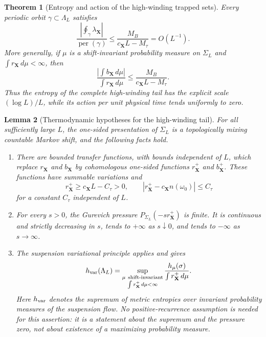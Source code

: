 \documentclass[11pt]{amsart}
\numberwithin{equation}{section}
\newtheorem{theorem}{Theorem}[section]
\newtheorem{lemma}[theorem]{Lemma}
\theoremstyle{definition}
\theoremstyle{remark}
\begin{document}
\begin{theorem}[Entropy and action of the high-winding trapped sets]
Every periodic orbit $\gamma\subset\Lambda_L$ satisfies
\begin{equation}\label{eq:tail-periodic-action-rate}
 \frac{\left|\displaystyle\oint_\gamma\lambda_{\mathbf X}\right|}
      {\operatorname{per}(\gamma)}
 \le \frac{M_B}{c_{\mathbf X}L-M_\tau}=O(L^{-1}).
\end{equation}
More generally, if $\mu$ is a shift-invariant probability measure on
$\Sigma_L$ and $\int r_{\mathbf X}\,d\mu<\infty$, then
\begin{equation}\label{eq:tail-measure-action-rate}
 \frac{\left|\int b_{\mathbf X}\,d\mu\right|}
      {\int r_{\mathbf X}\,d\mu}
 \le \frac{M_B}{c_{\mathbf X}L-M_\tau}.
\end{equation}
Thus the entropy of the complete high-winding tail has the explicit scale
$(\log L)/L$, while its action per unit physical time tends uniformly to
zero.
\end{theorem}

\begin{lemma}[Thermodynamic hypotheses for the high-winding tail]
\label{lem:tail-thermodynamic-hypotheses}
For all sufficiently large $L$, the one-sided presentation of
$\Sigma_L$ is a topologically mixing countable Markov shift, and the
following facts hold.
\begin{enumerate}
\renewcommand{\labelenumi}{\textup{(\roman{enumi})}}
\item There are bounded transfer functions, with bounds independent of
$L$, which replace $r_{\mathbf X}$ and $b_{\mathbf X}$ by cohomologous
one-sided functions $r_{\mathbf X}^+$ and $b_{\mathbf X}^+$.  These
functions have summable variations and
\begin{equation}\label{eq:tail-one-sided-roof-bounds}
 r_{\mathbf X}^+\ge c_{\mathbf X}L-C_\tau>0,
 \qquad
 |r_{\mathbf X}^+-c_{\mathbf X}n(\omega_0)|\le C_\tau
\end{equation}
for a constant $C_\tau$ independent of $L$.
\item For every $s>0$, the Gurevich pressure
$P_{\Sigma_L}(-s r_{\mathbf X}^+)$ is finite.  It is continuous and
strictly decreasing in $s$, tends to $+\infty$ as $s\downarrow0$, and
tends to $-\infty$ as $s\to\infty$.
\item The suspension variational principle applies and gives
\begin{equation}\label{eq:tail-suspension-variational-principle}
 h_{\rm var}(\Lambda_L)=
 \sup_{\substack{\mu\ \mathrm{shift\text{-}invariant}\\
                  \int r_{\mathbf X}^+\,d\mu<\infty}}
\frac{h_\mu(\sigma)}{\int r_{\mathbf X}^+\,d\mu}.
\end{equation}
Here $h_{\rm var}$ denotes the supremum of metric entropies over invariant
probability measures of the suspension flow.
No positive-recurrence assumption is needed for this assertion: it is a
statement about the supremum and the pressure zero, not about existence of
a maximizing probability measure.
\end{enumerate}
\end{lemma}
\end{document}

